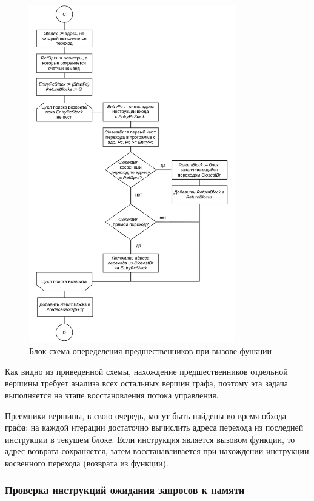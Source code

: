 \documentclass[a4paper,14pt]{extarticle}
\begin{document}
{\begin{figure}[H]
\centering
\includegraphics[width=0.8\textwidth]{diagrams/alg-cfg-call}
\caption{Блок-схема опеределения предшественников при вызове функции}
\label{fig:diagram-cfg-call}
\end{figure}

Как видно из приведенной схемы, нахождение предшественников отдельной вершины
требует анализа всех остальных вершин графа, поэтому эта задача выполняется
на этапе восстановления потока управления.

Преемники вершины, в свою очередь, могут быть найдены во время обхода графа:
на каждой итерации достаточно вычислить адреса перехода из последней инструкции в текущем блоке.
Если инструкция является вызовом функции, то адрес возврата сохраняется, затем восстанавливается
при нахождении инструкции косвенного перехода (возврата из функции).

\subsubsection{Проверка инструкций ожидания запросов к памяти}

}
\end{document}
